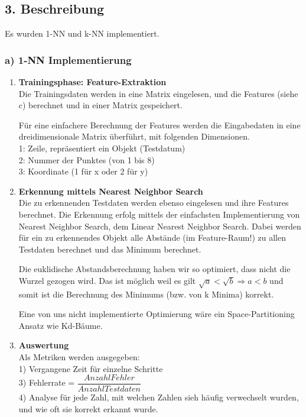 \documentclass{article}
\begin{document}
		\subsection*{3. Beschreibung}
			Es wurden 1-NN und k-NN implementiert.
			\subsubsection*{a) 1-NN Implementierung}
				\begin{enumerate}
				\item \textbf{Trainingsphase: Feature-Extraktion}\\
					Die Trainingsdaten werden in eine Matrix eingelesen, und die Features (siehe c) berechnet und in einer Matrix gespeichert.
					
					Für eine einfachere Berechnung der Features werden die Eingabedaten in eine dreidimensionale Matrix überführt, mit folgenden Dimensionen.\\
					1: Zeile, repräsentiert ein Objekt (Testdatum)\\
					2: Nummer der Punktes (von 1 bis 8)\\
					3: Koordinate (1 für x oder 2 für y)
					
				\item \textbf{Erkennung mittels Nearest Neighbor Search}\\
					Die zu erkennenden Testdaten werden ebenso eingelesen und ihre Features berechnet.
					Die Erkennung erfolg mittels der einfachsten Implementierung von Nearest Neighbor Search, dem Linear Nearest Neighbor Search. Dabei werden für ein zu erkennendes Objekt alle Abstände (im Feature-Raum!) zu allen Testdaten berechnet und das Minimum berechnet.
					
					Die euklidische Abstandsberechnung haben wir so optimiert, dass nicht die Wurzel gezogen wird. Das ist möglich weil es gilt $ \sqrt{a} < \sqrt{b} \Rightarrow a < b $ und somit ist die Berechnung des Minimums (bzw. von k Minima) korrekt.
					
					Eine von uns nicht implementierte Optimierung wäre ein Space-Partitioning Ansatz wie Kd-Bäume.
					
				\item \textbf{Auswertung}\\
					Als Metriken werden ausgegeben:\\
					1) Vergangene Zeit für einzelne Schritte\\
					3) Fehlerrate = $ \dfrac{Anzahl Fehler}{Anzahl Testdaten} $\\
					4) Analyse für jede Zahl, mit welchen Zahlen sieh häufig verwechselt wurden, und wie oft sie korrekt erkannt wurde.
				\end{enumerate}
				
\end{document}
